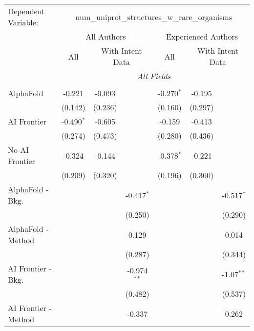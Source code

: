 \begingroup
\centering
\begin{tabular}{lcccccc}
   \tabularnewline \midrule \midrule
   Dependent Variable: & \multicolumn{6}{c}{num\_uniprot\_structures\_w\_rare\_organisms}\\
 & \multicolumn{3}{c}{All Authors} & \multicolumn{3}{c}{Experienced Authors} \\
\cmidrule(lr){2-4} \cmidrule(lr){5-7}
 & \multicolumn{1}{c}{All} & \multicolumn{2}{c}{With Intent Data} & \multicolumn{1}{c}{All} & \multicolumn{2}{c}{With Intent Data} \\
\cmidrule(lr){2-2} \cmidrule(lr){3-4} \cmidrule(lr){5-5} \cmidrule(lr){6-7}
 & \multicolumn{6}{c}{\textit{All Fields}} \\ \\
   AlphaFold               & -0.221       & -0.093  &               & -0.270$^{*}$ & -0.195  &   \\   
                           & (0.142)      & (0.236) &               & (0.160)      & (0.297) &   \\   
   AI Frontier             & -0.490$^{*}$ & -0.605  &               & -0.159       & -0.413  &   \\   
                           & (0.274)      & (0.473) &               & (0.280)      & (0.436) &   \\   
   No AI Frontier          & -0.324       & -0.144  &               & -0.378$^{*}$ & -0.221  &   \\   
                           & (0.209)      & (0.320) &               & (0.196)      & (0.360) &   \\   
   AlphaFold - Bkg.        &              &         & -0.417$^{*}$  &              &         & -0.517$^{*}$\\   
                           &              &         & (0.250)       &              &         & (0.290)\\   
   AlphaFold - Method      &              &         & 0.129         &              &         & 0.014\\   
                           &              &         & (0.287)       &              &         & (0.344)\\   
   AI Frontier - Bkg.      &              &         & -0.974$^{**}$ &              &         & -1.07$^{**}$\\   
                           &              &         & (0.482)       &              &         & (0.537)\\   
   AI Frontier - Method    &              &         & -0.337        &              &         & 0.262\\   

\end{tabular}

